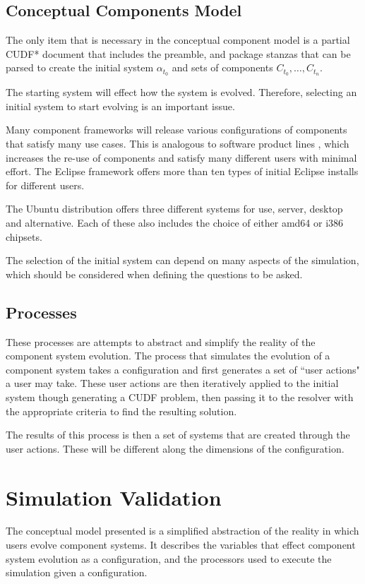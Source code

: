 \subsection{Conceptual Components Model}
The only item that is necessary in the conceptual component model is 
a partial CUDF* document that includes the preamble, and package stanzas that can be parsed to create the initial system $\alpha_{t_0}$ and sets of components $C_{t_0},\ldots,C_{t_n}$.

The starting system will effect how the system is evolved.
Therefore, selecting an initial system to start evolving is an important issue.

Many component frameworks will release various configurations of components that satisfy many use cases.
This is analogous to software product lines \citep{clements2001software}, which increases the re-use of components and satisfy many different users with minimal effort.
The Eclipse framework offers more than ten types of initial Eclipse installs for different users.

The Ubuntu distribution offers three different systems for use, server, desktop and alternative.
Each of these also includes the choice of either amd64 or i386 chipsets.

The selection of the initial system can depend on many aspects of the simulation, which should be considered when defining the questions to be asked.



\subsection{Processes}
These processes are attempts to abstract and simplify the reality of the component system evolution.
The process that simulates the evolution of a component system takes a configuration and first generates a set of ``user actions" a user may take.
These user actions are then iteratively applied to the initial system though generating a CUDF problem,
then passing it to the resolver with the appropriate criteria to find the resulting solution.

The results of this process is then a set of systems that are created through the user actions.
These will be different along the dimensions of the configuration.




\section{Simulation Validation}
The conceptual model presented is a simplified abstraction of the reality in which users evolve component systems.
It describes the variables that effect component system evolution as a configuration,
and the processors used to execute the simulation given a configuration.

